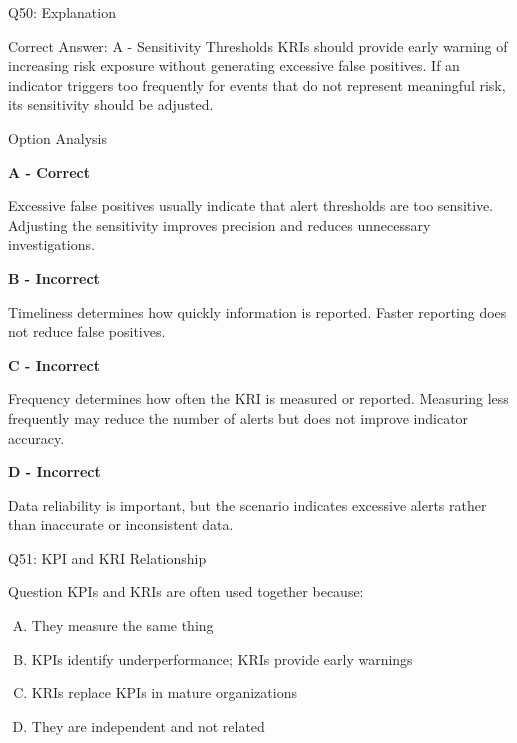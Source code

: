 \documentclass{beamer}
\begin{document}
	\begin{frame}[shrink=10]{Q50: Explanation}
		\footnotesize
		
		\begin{block}{Correct Answer: A - Sensitivity Thresholds}
			KRIs should provide early warning of increasing risk exposure
			without generating excessive false positives. If an indicator
			triggers too frequently for events that do not represent
			meaningful risk, its sensitivity should be adjusted.
		\end{block}
		
		\begin{block}{Option Analysis}
			
			\textbf{A - Correct}
			
			Excessive false positives usually indicate that alert thresholds
			are too sensitive. Adjusting the sensitivity improves precision
			and reduces unnecessary investigations.
			
			\vspace{0.15cm}
			
			\textbf{B - Incorrect}
			
			Timeliness determines how quickly information is reported.
			Faster reporting does not reduce false positives.
			
			\vspace{0.15cm}
			
			\textbf{C - Incorrect}
			
			Frequency determines how often the KRI is measured or reported.
			Measuring less frequently may reduce the number of alerts but
			does not improve indicator accuracy.
			
			\vspace{0.15cm}
			
			\textbf{D - Incorrect}
			
			Data reliability is important, but the scenario indicates
			excessive alerts rather than inaccurate or inconsistent data.
			
		\end{block}
		

		
	\end{frame}
	
	\begin{frame}{Q51: KPI and KRI Relationship}
		\begin{block}{Question}
			KPIs and KRIs are often used together because:
		\end{block}
		\begin{enumerate}[(A)]
			\item They measure the same thing
			\item KPIs identify underperformance; KRIs provide early warnings
			\item KRIs replace KPIs in mature organizations
			\item They are independent and not related
		\end{enumerate}
	\end{frame}
	
\end{document}
